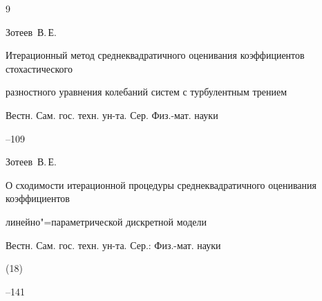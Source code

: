 \begin{thebibliography}{9}


\by Зотеев~В.\,Е. 

\paper Итерационный метод среднеквадратичного оценивания коэффициентов стохастического

разностного уравнения колебаний систем с турбулентным трением 

\jour Вестн. Сам. гос. техн. ун-та. Сер. Физ.-мат. науки



--109




\by Зотеев~В.\,Е. 

\paper О сходимости итерационной процедуры среднеквадратичного оценивания коэффициентов

линейно"=параметрической дискретной модели   

\jour Вестн. Сам. гос. техн. ун-та. Сер.: Физ.-мат. науки


(18)

--141



\end{thebibliography}











\makeengtitle





%

